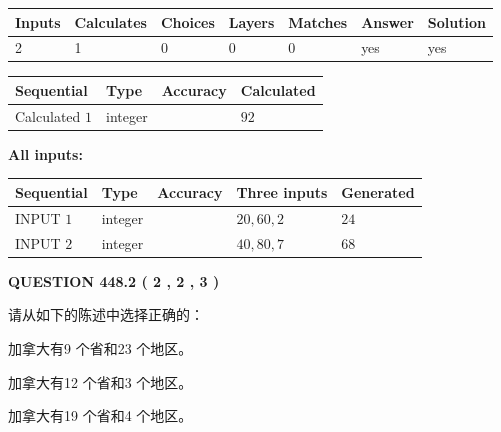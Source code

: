 \documentclass{ctexart}
\begin{document}
   
\noindent\begin{tabular}{|l|l|l|l|l|l|l|}
 \hline
Inputs & Calculates & Choices & Layers & Matches & Answer & Solution \\ \hline
 2  & 
 1  & 
 0
  & 
 0  & 
 0  & 
  yes & 
  yes 
  \\ \hline
 \end{tabular}
   
   
   
   
\noindent{}
   
   
  
  
\noindent\begin{tabular}{|l|l|l|l|}
\hline
 Sequential & Type & Accuracy & Calculated \\ 
\hline
 
 
  Calculated $  1 $ & integer &  & 
  $ 92 $ 
 \\  \hline  
 \end{tabular}
   
   
   
   
\noindent\vspace{0.1in}\hspace{-0.08in} {\textbf{\Large{All inputs: }}}
   
   
  
  
\noindent\begin{tabular}{|l|l|l|l|l|}
\hline
 Sequential & Type & Accuracy & Three inputs & Generated \\ 
\hline
 
 
  INPUT $  1 $ & integer &  & $
 20
 , 
 60
 , 
 2
 $ & $ 24 $ 
 \\  \hline  
 
 
  INPUT $  2 $ & integer &  & $
 40
 , 
 80
 , 
 7
 $ & $ 68 $ 
 \\  \hline  
 \end{tabular}
   
   
  
\vspace{0.2in}
  
{\textbf{\Large{QUESTION
448.2 
 ( 2 , 2 , 3 )
}}}
  
  
请从如下的陈述中选择正确的：
 
 
加拿大有9 个省和23 个地区。
 
 
加拿大有12 个省和3 个地区。
 
 
加拿大有19 个省和4 个地区。
 
\end{document}
